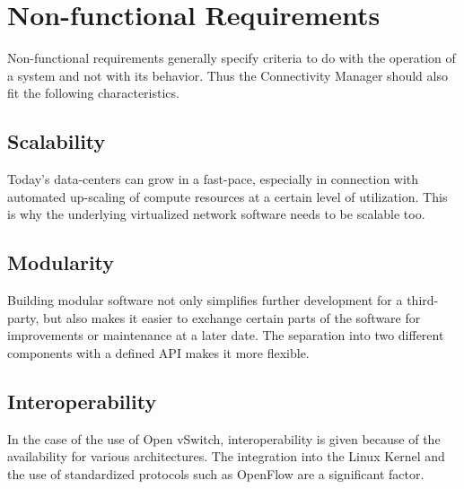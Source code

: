 \section{Non-functional Requirements}

Non-functional requirements generally specify criteria to do with the operation of a system and not with its behavior. Thus the Connectivity Manager should also fit the following characteristics.

\subsection{Scalability}

Today's data-centers can grow in a fast-pace, especially in connection with automated up-scaling of compute resources at a certain level of utilization. This is why the underlying virtualized network software needs to be scalable too.

\subsection{Modularity}

Building modular software not only simplifies further development for a third-party, but also makes it easier to exchange certain parts of the software for improvements or maintenance at a later date. The separation into two different components with a defined API makes it more flexible.

\subsection{Interoperability}

In the case of the use of Open vSwitch, interoperability is given because of the availability for various architectures. The integration into the Linux Kernel and the use of standardized protocols such as OpenFlow are a significant factor.